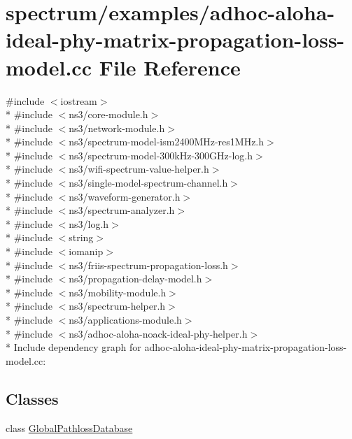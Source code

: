\hypertarget{adhoc-aloha-ideal-phy-matrix-propagation-loss-model_8cc}{}\section{spectrum/examples/adhoc-\/aloha-\/ideal-\/phy-\/matrix-\/propagation-\/loss-\/model.cc File Reference}
\label{adhoc-aloha-ideal-phy-matrix-propagation-loss-model_8cc}
{\ttfamily \#include $<$iostream$>$}\\*
{\ttfamily \#include $<$ns3/core-\/module.\+h$>$}\\*
{\ttfamily \#include $<$ns3/network-\/module.\+h$>$}\\*
{\ttfamily \#include $<$ns3/spectrum-\/model-\/ism2400\+M\+Hz-\/res1\+M\+Hz.\+h$>$}\\*
{\ttfamily \#include $<$ns3/spectrum-\/model-\/300k\+Hz-\/300\+G\+Hz-\/log.\+h$>$}\\*
{\ttfamily \#include $<$ns3/wifi-\/spectrum-\/value-\/helper.\+h$>$}\\*
{\ttfamily \#include $<$ns3/single-\/model-\/spectrum-\/channel.\+h$>$}\\*
{\ttfamily \#include $<$ns3/waveform-\/generator.\+h$>$}\\*
{\ttfamily \#include $<$ns3/spectrum-\/analyzer.\+h$>$}\\*
{\ttfamily \#include $<$ns3/log.\+h$>$}\\*
{\ttfamily \#include $<$string$>$}\\*
{\ttfamily \#include $<$iomanip$>$}\\*
{\ttfamily \#include $<$ns3/friis-\/spectrum-\/propagation-\/loss.\+h$>$}\\*
{\ttfamily \#include $<$ns3/propagation-\/delay-\/model.\+h$>$}\\*
{\ttfamily \#include $<$ns3/mobility-\/module.\+h$>$}\\*
{\ttfamily \#include $<$ns3/spectrum-\/helper.\+h$>$}\\*
{\ttfamily \#include $<$ns3/applications-\/module.\+h$>$}\\*
{\ttfamily \#include $<$ns3/adhoc-\/aloha-\/noack-\/ideal-\/phy-\/helper.\+h$>$}\\*
Include dependency graph for adhoc-\/aloha-\/ideal-\/phy-\/matrix-\/propagation-\/loss-\/model.cc\+:
\subsection*{Classes}
\begin{DoxyCompactItemize}
\item 
class \hyperlink{classGlobalPathlossDatabase}{Global\+Pathloss\+Database}
\end{DoxyCompactItemize}
